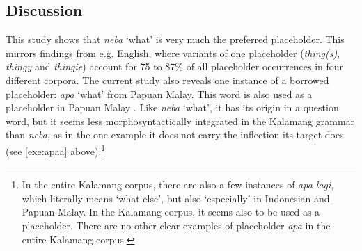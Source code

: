 \documentclass[output=paper,colorlinks,citecolor=brown
\ChapterDOI{10.5281/zenodo.15697587}
]{langscibook}
\begin{document}
\subsection{Discussion}
This study shows that \textit{neba} `what' is very much the preferred placeholder. This mirrors findings from e.g. English, where variants of one placeholder (\textit{thing(s)}, \textit{thingy} and \textit{thingie}) account for 75 to 87\% of all placeholder occurrences \citep{palacios2015} in four different corpora. The current study also reveals one instance of a borrowed placeholder: \textit{apa} `what' from Papuan Malay. This word is also used as a placeholder in Papuan Malay \citep[316]{kluge2017}. Like \textit{neba} `what', it has its origin in a question word, but it seems less morphosyntactically integrated in the Kalamang grammar than \textit{neba}, as in the one example it does not carry the inflection its target does (see \ref{exe:apaa} above).\footnote{In the entire Kalamang corpus, there are also a few instances of \textit{apa lagi}, which literally means `what else', but also `especially' in Indonesian and Papuan Malay. In the Kalamang corpus, it seems also to be used as a placeholder. There are no other clear examples of placeholder \textit{apa} in the entire Kalamang corpus.}
\end{document}
